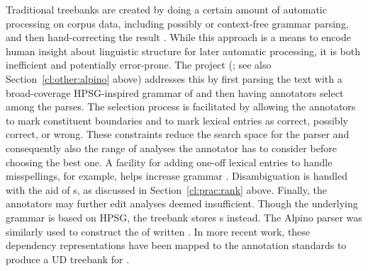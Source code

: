 \documentclass[output=paper
 	        ,biblatex
                ,babelshorthands
                ,newtxmath
                ,draftmode
                ,colorlinks, citecolor=brown
]{langscibook}
\begin{document}
Traditional treebanks are created by doing a certain amount of automatic processing on corpus data,
including possibly  or context-free grammar parsing,
and then hand-correcting the result \citep{Mar:San:Mar:93,Ban:Bon:Cai:13}.  While this approach is a
means to encode human insight about linguistic structure for later automatic processing, it is both
inefficient and potentially error-prone. The  project (\citealt{vanderbeek2002alpino};
see also Section~\ref{cl:other:alpino} above) addresses this by first parsing the text with a
broad-coverage HPSG-inspired grammar of  and then having annotators select
among the parses.  The selection process is facilitated by allowing the annotators to mark
constituent boundaries and to mark lexical entries as
correct, possibly correct, or wrong.  These constraints reduce the search space for the parser and
consequently also the range of analyses the annotator has to consider before choosing the best
one. A facility for adding one-off lexical entries to handle misspellings, for example, helps
increase grammar .  Disambiguation is handled with
the aid of s, as discussed in Section~\ref{cl:prac:rank} above. Finally, the
annotators may further edit analyses deemed insufficient. Though the underlying grammar is based on
HPSG, the treebank stores s instead.  The Alpino parser was similarly used to
construct the  of written  \citep{van:bou:van:13}.  In more recent
work, these dependency representations have been mapped to the 
annotation standards \citep{Niv:Mar:Gin:16} to produce a UD treebank for 
\citep{Bou:Van:17}.
\end{document}
